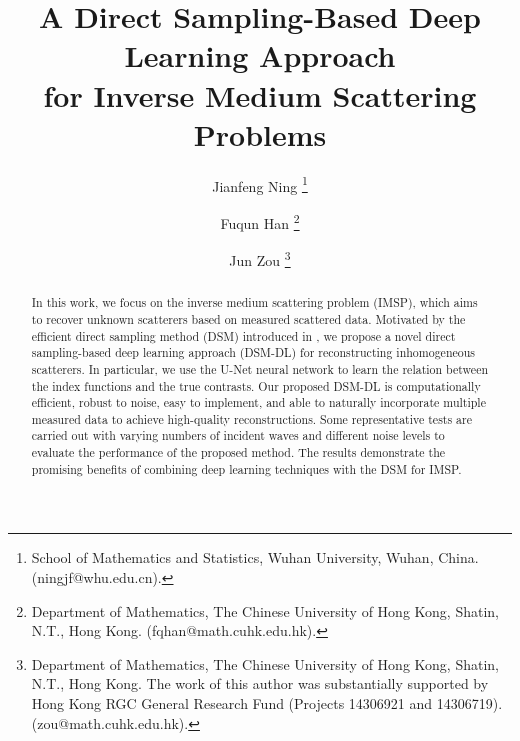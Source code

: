 \documentclass{article}
\title{A Direct Sampling-Based Deep Learning Approach \\for Inverse Medium Scattering Problems}
\date{}
\author{Jianfeng Ning \thanks{School of Mathematics and Statistics, Wuhan University, Wuhan, China. ({ningjf@whu.edu.cn}).} \and Fuqun Han \thanks{Department of Mathematics, The Chinese University of Hong Kong, Shatin, N.T., Hong Kong.  ({fqhan@math.cuhk.edu.hk}).}  \and Jun Zou \thanks{Department of Mathematics, The Chinese University of Hong Kong, Shatin, N.T., Hong Kong. The work of this author was substantially supported by Hong Kong RGC General Research Fund (Projects 14306921 and 14306719). ({zou@math.cuhk.edu.hk}).}}
\begin{document}
	\maketitle
	\begin{abstract}
		In this work, we focus on the inverse medium scattering problem (IMSP), which aims to recover unknown scatterers based on measured scattered data. Motivated by the efficient direct sampling method (DSM) introduced in \cite{ito2012direct}, we propose a novel direct sampling-based deep learning approach (DSM-DL)  for reconstructing inhomogeneous scatterers. In particular, we use the U-Net neural network to learn the relation between the index functions and the true contrasts. Our proposed DSM-DL is computationally efficient, robust to noise, easy to implement, and able to naturally incorporate multiple measured data to achieve high-quality reconstructions. Some representative tests are carried out with  varying numbers of incident waves and different noise levels to evaluate the performance of the proposed method. The results demonstrate the promising benefits of combining deep learning techniques with the DSM for IMSP.
	\end{abstract}
 
\end{document}
